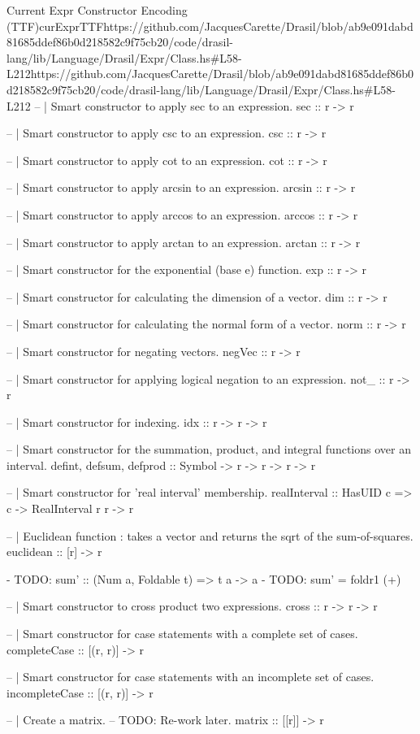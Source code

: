 \begin{haskell}{Current Expr Constructor Encoding (TTF)}{curExprTTF}{https://github.com/JacquesCarette/Drasil/blob/ab9e091dabd81685ddef86b0d218582c9f75c\newline{}b20/code/drasil-lang/lib/Language/Drasil/Expr/Class.hs\#L58-L212}{https://github.com/JacquesCarette/Drasil/blob/ab9e091dabd81685ddef86b0d218582c9f75cb20/code/drasil-lang/lib/Language/Drasil/Expr/Class.hs\#L58-L212}
  -- | Smart constructor to apply sec to an expression.
  sec :: r -> r 
  
  -- | Smart constructor to apply csc to an expression.
  csc :: r -> r
  
  -- | Smart constructor to apply cot to an expression.
  cot :: r -> r 
  
  -- | Smart constructor to apply arcsin to an expression.
  arcsin :: r -> r 
  
  -- | Smart constructor to apply arccos to an expression.
  arccos :: r -> r 
  
  -- | Smart constructor to apply arctan to an expression.
  arctan :: r -> r 
  
  -- | Smart constructor for the exponential (base e) function.
  exp :: r -> r
  
  -- | Smart constructor for calculating the dimension of a vector.
  dim :: r -> r
  
  -- | Smart constructor for calculating the normal form of a vector.
  norm :: r -> r
  
  -- | Smart constructor for negating vectors.
  negVec :: r -> r
  
  -- | Smart constructor for applying logical negation to an expression.
  not_ :: r -> r
  
  -- | Smart constructor for indexing.
  idx :: r -> r -> r
  
  -- | Smart constructor for the summation, product, and integral functions over an interval.
  defint, defsum, defprod :: Symbol -> r -> r -> r -> r
  
  -- | Smart constructor for 'real interval' membership.
  realInterval :: HasUID c => c -> RealInterval r r -> r
  
  -- | Euclidean function : takes a vector and returns the sqrt of the sum-of-squares.
  euclidean :: [r] -> r
  
  -   TODO:  sum' :: (Num a, Foldable t) => t a -> a
  -   TODO:  sum' = foldr1 (+)
    
  -- | Smart constructor to cross product two expressions.
  cross :: r -> r -> r
  
  -- | Smart constructor for case statements with a complete set of cases.
  completeCase :: [(r, r)] -> r
  
  -- | Smart constructor for case statements with an incomplete set of cases.
  incompleteCase :: [(r, r)] -> r
  
  -- | Create a matrix.
  -- TODO: Re-work later.
  matrix :: [[r]] -> r
  

\end{haskell}
